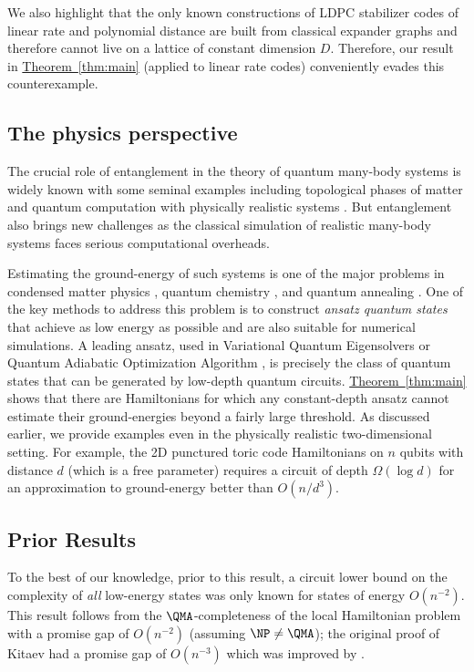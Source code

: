 \documentclass[11pt]{article}
\newcommand{\expref}[2]{\texorpdfstring{\hyperref[#2]{#1~\ref{#2}}}{#1~\ref{#2}}}
\begin{document}
We also highlight that the only known constructions of LDPC stabilizer codes of linear rate and polynomial distance are built from classical expander graphs and therefore cannot live on a lattice of constant dimension $D$. Therefore, our result in \expref{Theorem}{thm:main} (applied to linear rate codes) conveniently evades this counterexample.




\subsection{The physics perspective}

 
The crucial role of entanglement in the theory of quantum many-body systems is widely known with some seminal examples including topological phases of matter \cite{KitaevP06} and quantum computation with physically realistic systems \cite{RaussendorfB01, RaussendorfB03}. But entanglement also brings new challenges as the classical simulation of realistic many-body systems faces serious computational overheads. 

Estimating the ground-energy of such systems is one of the major problems in condensed matter physics \cite{White92}, quantum chemistry \cite{Cao2019}, and quantum annealing \cite{ApolloniCF89, KadowakiN98}. One of the key methods to address this problem is to construct \emph{ansatz quantum states} that achieve as
%
low energy  %
as possible and are also suitable for numerical simulations. A leading ansatz, used in Variational Quantum Eigensolvers \cite{Peruzzo14, LaRose2019, Cao2019} or Quantum Adiabatic Optimization Algorithm \cite{farhi2014quantum}, is precisely the class of quantum states that can be generated by low-depth quantum circuits. 
%
\expref{Theorem}{thm:main} shows that there are Hamiltonians for which any constant-depth ansatz cannot estimate their ground-energies beyond a fairly large threshold. As discussed earlier, we provide examples even in the physically realistic two-dimensional setting. For example, the 2D punctured toric code Hamiltonians on $n$ qubits with distance $d$ (which is a free parameter) requires a circuit of depth $\Omega(\log d)$ for an approximation to ground-energy better than $O(n/d^3)$.  

\subsection{Prior Results}

To the best of our knowledge, prior to this result, a circuit lower bound on the complexity of \emph{all} low-energy states was only known for states of energy $O(n^{-2})$. This result follows from the $\QMA$-completeness of the local Hamiltonian problem with a promise gap of $O(n^{-2})$ (assuming $\NP \neq \QMA$); the original proof of Kitaev had a promise gap of $O(n^{-3})$  \cite{10.5555/863284,doi:10.1137/S0097539704445226} which was improved by \cite{PhysRevA.97.062306,Bausch2018analysislimitations}.
\end{document}
